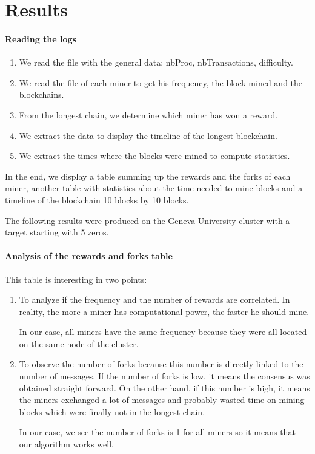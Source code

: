 \section{Results}

\paragraph{Reading the logs}


\begin{enumerate}
  \item We read the file with the general data: nbProc, nbTransactions, difficulty.
  \item We read the file of each miner to get his frequency, the block mined and the blockchains.
  \item From the longest chain, we determine which miner has won a reward.
  \item We extract the data to display the timeline of the longest blockchain.
  \item We extract the times where the blocks were mined to compute statistics.
\end{enumerate}
\medskip

In the end, we display a table summing up the rewards and the forks of each miner, another table with statistics about the time needed to mine blocks and a timeline of the blockchain 10 blocks by 10 blocks. \newline

The following results were produced on the Geneva University cluster with a target starting with 5 zeros.

\paragraph{Analysis of the rewards and forks table}

This table is interesting in two points: \newline

\begin{enumerate}
  \item To analyze if the frequency and the number of rewards are correlated. In reality, the more a miner has computational power, the faster he should mine. \newline

  In our case, all miners have the same frequency because they were all located on the same node of the cluster.

  \item To observe the number of forks because this number is directly linked to the number of messages. If the number of forks is low, it means the consensus was obtained straight forward. On the other hand, if this number is high, it means the miners exchanged a lot of messages and probably wasted time on mining blocks which were finally not in the longest chain. \newline

  In our case, we see the number of forks is 1 for all miners so it means that our algorithm works well.
\end{enumerate}

